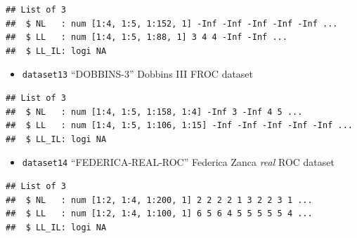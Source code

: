 \documentclass[
]{book}
\providecommand{\tightlist}{%
  \setlength{\itemsep}{0pt}\setlength{\parskip}{0pt}}
\begin{document}
\begin{verbatim}
## List of 3
##  $ NL   : num [1:4, 1:5, 1:152, 1] -Inf -Inf -Inf -Inf -Inf ...
##  $ LL   : num [1:4, 1:5, 1:88, 1] 3 4 4 -Inf -Inf ...
##  $ LL_IL: logi NA
\end{verbatim}

\begin{itemize}
\tightlist
\item
  \texttt{dataset13} ``DOBBINS-3'' Dobbins III FROC dataset \citep{Dobbins2016MultiInstitutional}
\end{itemize}

\begin{verbatim}
## List of 3
##  $ NL   : num [1:4, 1:5, 1:158, 1:4] -Inf 3 -Inf 4 5 ...
##  $ LL   : num [1:4, 1:5, 1:106, 1:15] -Inf -Inf -Inf -Inf -Inf ...
##  $ LL_IL: logi NA
\end{verbatim}

\begin{itemize}
\tightlist
\item
  \texttt{dataset14} ``FEDERICA-REAL-ROC'' Federica Zanca \emph{real} ROC dataset \citep{RN2318}
\end{itemize}

\begin{verbatim}
## List of 3
##  $ NL   : num [1:2, 1:4, 1:200, 1] 2 2 2 2 1 3 2 2 3 1 ...
##  $ LL   : num [1:2, 1:4, 1:100, 1] 6 5 6 4 5 5 5 5 5 4 ...
##  $ LL_IL: logi NA
\end{verbatim}

  
\end{document}
